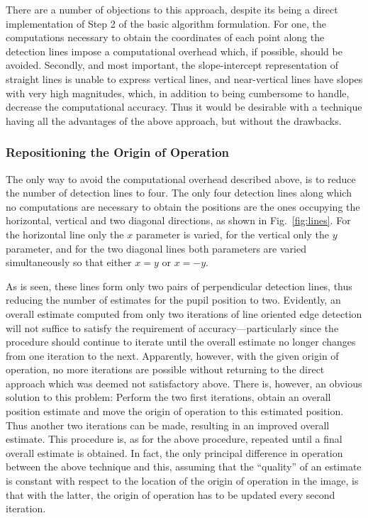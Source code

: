 There are a number of objections to this approach, despite its being a
direct implementation of Step 2 of the basic algorithm formulation.
For one, the computations necessary to obtain the coordinates of each
point along the detection lines impose a computational overhead which,
if possible, should be avoided.  Secondly, and most important, the
slope-intercept representation of straight lines is unable to express
vertical lines, and near-vertical lines have slopes with very high
magnitudes, which, in addition to being cumbersome to handle, decrease
the computational accuracy.  Thus it would be desirable with a
technique having all the advantages of the above approach, but without
the drawbacks.

\subsubsection{Repositioning the Origin of Operation}


The only way to avoid the computational overhead described above, is
to reduce the number of detection lines to four.  The only four
detection lines along which no computations are necessary to obtain
the positions are the ones occupying the horizontal, vertical and two
diagonal directions, as shown in Fig.~\ref{fig:lines}.  For the
horizontal line only the $x$ parameter is varied, for the vertical
only the $y$ parameter, and for the two diagonal lines both parameters
are varied simultaneously so that either $x=y$ or $x=-y$.  

As is seen, these lines form only two pairs of perpendicular detection
lines, thus reducing the number of estimates for the pupil position to
two.  Evidently, an overall estimate computed from only two iterations
of line oriented edge detection will not suffice to satisfy the
requirement of accuracy---particularly since the procedure should
continue to iterate until the overall estimate no longer changes from
one iteration to the next.  Apparently, however, with the given origin
of operation, no more iterations are possible without returning to the
direct approach which was deemed not satisfactory above.  There is,
however, an obvious solution to this problem: Perform the two first
iterations, obtain an overall position estimate and move the origin of
operation to this estimated position.  Thus another two iterations can
be made, resulting in an improved overall estimate.  This procedure
is, as for the above procedure, repeated until a final overall
estimate is obtained.  In fact, the only principal difference in
operation between the above technique and this, assuming that the
``quality'' of an estimate is constant with respect to the location of
the origin of operation in the image, is that with the latter, the
origin of operation has to be updated every second iteration.

